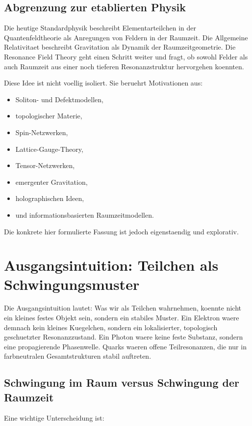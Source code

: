 \documentclass[11pt,a4paper]{article}
\newcommand{\RFT}{Resonance Field Theory}
\begin{document}
\subsection{Abgrenzung zur etablierten Physik}

Die heutige Standardphysik beschreibt Elementarteilchen in der Quantenfeldtheorie als Anregungen von Feldern in
der Raumzeit. Die Allgemeine Relativitaet beschreibt Gravitation als Dynamik der Raumzeitgeometrie. Die \RFT{}
geht einen Schritt weiter und fragt, ob sowohl Felder als auch Raumzeit aus einer noch tieferen Resonanzstruktur
hervorgehen koennten.

Diese Idee ist nicht voellig isoliert. Sie beruehrt Motivationen aus:
\begin{itemize}
  \item Soliton- und Defektmodellen,
  \item topologischer Materie,
  \item Spin-Netzwerken,
  \item Lattice-Gauge-Theory,
  \item Tensor-Netzwerken,
  \item emergenter Gravitation,
  \item holographischen Ideen,
  \item und informationsbasierten Raumzeitmodellen.
\end{itemize}

Die konkrete hier formulierte Fassung ist jedoch eigenstaendig und explorativ.

\section{Ausgangsintuition: Teilchen als Schwingungsmuster}

Die Ausgangsintuition lautet: Was wir als Teilchen wahrnehmen, koennte nicht ein kleines festes Objekt sein,
sondern ein stabiles Muster. Ein Elektron waere demnach kein kleines Kuegelchen, sondern ein lokalisierter,
topologisch geschuetzter Resonanzzustand. Ein Photon waere keine feste Substanz, sondern eine propagierende
Phasenwelle. Quarks waeren offene Teilresonanzen, die nur in farbneutralen Gesamtstrukturen stabil auftreten.

\subsection{Schwingung im Raum versus Schwingung der Raumzeit}

Eine wichtige Unterscheidung ist:
\end{document}
